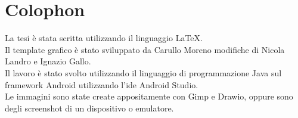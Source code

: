 \chapter*{Colophon}

La tesi è stata scritta utilizzando il linguaggio LaTeX.\\
Il template grafico è stato sviluppato da Carullo Moreno modifiche di Nicola Landro e Ignazio Gallo.\\
Il lavoro è stato svolto utilizzando il linguaggio di programmazione Java sul framework Android utilizzando l'ide Android Studio.\\
Le immagini sono state create appositamente con Gimp e Drawio, oppure sono degli screenshot di un dispositivo o emulatore.